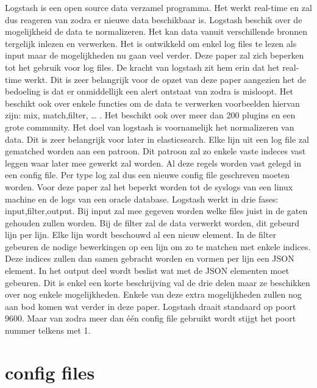 Logstash is een open source data verzamel programma. Het werkt real-time en zal dus reageren van zodra er nieuwe data beschikbaar is.  Logstash beschik over de mogelijkheid de data te normalizeren. 
 Het kan data vanuit verschillende bronnen tergelijk inlezen en verwerken. 
Het is ontwikkeld om enkel log files te lezen als input maar de mogelijkheden nu gaan veel verder.
Deze paper zal zich beperken tot het gebruik voor log files. 
De kracht van logstash zit hem erin dat het real-time werkt. Dit is zeer belangrijk voor de opzet van deze paper aangezien het de bedoeling is dat er onmiddellijk een alert ontstaat van zodra is misloopt. Het beschikt ook over enkele functies om de data te verwerken voorbeelden hiervan zijn: mix, match,filter, … .  
Het beschikt ook over meer dan 200 plugins en een grote community.
Het doel van logstash is voornamelijk het normalizeren van data. Dit is zeer belangrijk voor later in elasticsearch. Elke lijn uit een log file zal gematched worden aan een patroon. Dit patroon zal zo enkele vaste indeces vast leggen waar later mee gewerkt zal worden.
Al deze regels worden vast gelegd in een config file. Per type log zal dus een nieuwe config file geschreven moeten worden. Voor deze paper zal het beperkt worden tot de syslogs van een linux machine en de logs van een oracle database.
Logstash werkt in drie fases: input,filter,output. Bij input zal mee gegeven worden welke files juist in de gaten gehouden zullen worden. Bij de filter zal de data verwerkt worden, dit gebeurd lijn per lijn. Elke lijn wordt beschouwd al een nieuw element. In de filter gebeuren de nodige bewerkingen op een lijn om zo te matchen met enkele indices. Deze indices zullen dan samen gebracht worden en vormen per lijn een JSON element. In het output deel wordt beslist wat met de JSON elementen moet gebeuren.  
Dit is enkel een korte beschrijving val de drie delen maar ze beschikken over nog enkele mogelijkheden. Enkele van deze extra mogelijkheden zullen nog aan bod komen wat verder in deze paper. 
Logstash draait standaard op poort 9600. Maar van zodra meer dan één config file gebruikt wordt stijgt het poort nummer telkens met 1. 

\section{config files}
\label{sec:logstash-config-files}

